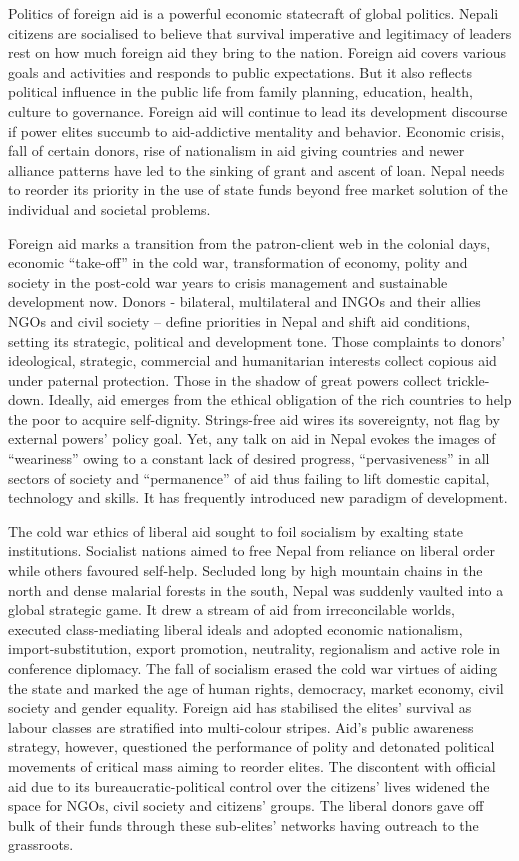 \documentclass[
  openany]{book}
\begin{document}
Politics of foreign aid is a powerful economic statecraft of global politics. Nepali citizens are socialised to believe that survival imperative and legitimacy of leaders rest on how much foreign aid they bring to the nation. Foreign aid covers various goals and activities and responds to public expectations. But it also reflects political influence in the public life from family planning, education, health, culture to governance. Foreign aid will continue to lead its development discourse if power elites succumb to aid-addictive mentality and behavior. Economic crisis, fall of certain donors, rise of nationalism in aid giving countries and newer alliance patterns have led to the sinking of grant and ascent of loan. Nepal needs to reorder its priority in the use of state funds beyond free market solution of the individual and societal problems.

Foreign aid marks a transition from the patron-client web in the colonial days, economic ``take-off'' in the cold war, transformation of economy, polity and society in the post-cold war years to crisis management and sustainable development now. Donors - bilateral, multilateral and INGOs and their allies NGOs and civil society -- define priorities in Nepal and shift aid conditions, setting its strategic, political and development tone. Those complaints to donors' ideological, strategic, commercial and humanitarian interests collect copious aid under paternal protection. Those in the shadow of great powers collect trickle-down. Ideally, aid emerges from the ethical obligation of the rich countries to help the poor to acquire self-dignity. Strings-free aid wires its sovereignty, not flag by external powers' policy goal. Yet, any talk on aid in Nepal evokes the images of ``weariness'' owing to a constant lack of desired progress, ``pervasiveness'' in all sectors of society and ``permanence'' of aid thus failing to lift domestic capital, technology and skills. It has frequently introduced new paradigm of development.

The cold war ethics of liberal aid sought to foil socialism by exalting state institutions. Socialist nations aimed to free Nepal from reliance on liberal order while others favoured self-help. Secluded long by high mountain chains in the north and dense malarial forests in the south, Nepal was suddenly vaulted into a global strategic game. It drew a stream of aid from irreconcilable worlds, executed class-mediating liberal ideals and adopted economic nationalism, import-substitution, export promotion, neutrality, regionalism and active role in conference diplomacy. The fall of socialism erased the cold war virtues of aiding the state and marked the age of human rights, democracy, market economy, civil society and gender equality. Foreign aid has stabilised the elites' survival as labour classes are stratified into multi-colour stripes. Aid's public awareness strategy, however, questioned the performance of polity and detonated political movements of critical mass aiming to reorder elites. The discontent with official aid due to its bureaucratic-political control over the citizens' lives widened the space for NGOs, civil society and citizens' groups. The liberal donors gave off bulk of their funds through these sub-elites' networks having outreach to the grassroots.
\end{document}
